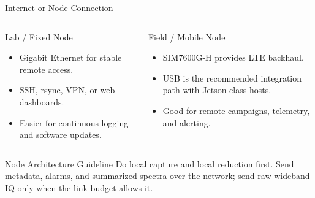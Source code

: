 \documentclass{beamer}
\begin{document}
\begin{frame}{Internet or Node Connection}
    \small
    \begin{columns}[T]
        \begin{block}{Lab / Fixed Node}
            \begin{itemize}
                \item Gigabit Ethernet for stable remote access.
                \item SSH, rsync, VPN, or web dashboards.
                \item Easier for continuous logging and software updates.
            \end{itemize}
        \end{block}

        \begin{block}{Field / Mobile Node}
            \begin{itemize}
                \item SIM7600G-H provides LTE backhaul.
                \item USB is the recommended integration path with Jetson-class hosts.
                \item Good for remote campaigns, telemetry, and alerting.
            \end{itemize}
        \end{block}
    \end{columns}

    \vspace{0.5em}

    \begin{alertblock}{Node Architecture Guideline}
        Do local capture and local reduction first. Send metadata, alarms, and summarized spectra over the network; send raw wideband IQ only when the link budget allows it.
    \end{alertblock}
\end{frame}
\end{document}
